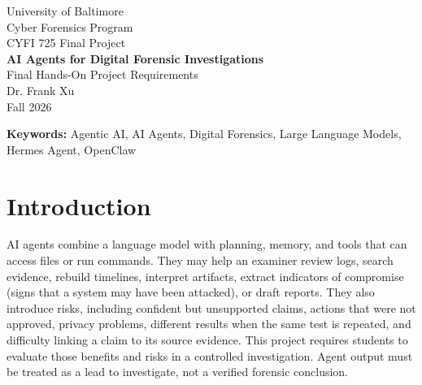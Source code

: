 \documentclass[12pt,letterpaper]{article}
\begin{document}

\begin{center}
    \thispagestyle{empty}
    {\LARGE University of Baltimore}\\[0.5cm]
    {\Large Cyber Forensics Program}\\[2.5cm]
    {\linespread{1.2}\selectfont\Large CYFI 725 Final Project}\\[0.6cm]
    {\huge\bfseries AI Agents for Digital Forensic Investigations}\\[1.5cm]
    \vspace{\fill}
    {\Large Final Hands-On Project Requirements}\\[0.5cm]
    {\Large Dr. Frank Xu}\\[0.5cm]
    {\Large Fall 2026}
\end{center}

\clearpage
{}
\tableofcontents
\clearpage

\begin{abstract}
    This final project examines how an AI agent can support a digital forensic investigation. In teams of three or four, students will select, install, test, and carefully evaluate either Hermes Agent or OpenClaw. The agent must run in an isolated virtual machine or container and may access only copied, non-sensitive sample evidence. Each team will read three or four instructor-assigned research papers or scholarly readings, investigate four instructor-provided artifacts---one text, one image, one audio, and one video artifact---check the agent's results against expected results established through independent examination (ground truth), and evaluate both useful and unreliable behavior. The deliverables are a professional technical report normally 18--22 pages, including references but excluding the title page, table of contents, and appendices, and a 20--25 minute presentation. The project is worth 100 points.
\end{abstract}


\noindent\textbf{Keywords:} Agentic AI, AI Agents, Digital Forensics, Large Language Models, Hermes Agent, OpenClaw

\section{Introduction}
AI agents combine a language model with planning, memory, and tools that can access files or run commands. They may help an examiner review logs, search evidence, rebuild timelines, interpret artifacts, extract indicators of compromise (signs that a system may have been attacked), or draft reports. They also introduce risks, including confident but unsupported claims, actions that were not approved, privacy problems, different results when the same test is repeated, and difficulty linking a claim to its source evidence. This project requires students to evaluate those benefits and risks in a controlled investigation. Agent output must be treated as a lead to investigate, not a verified forensic conclusion.
\end{document}
